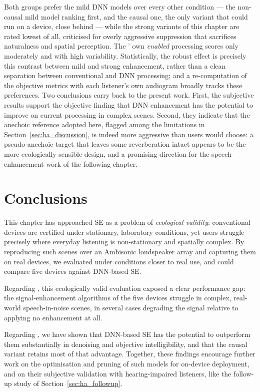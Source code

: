 Both groups prefer the mild \acrshort{DNN} models over every other condition ---
the non-causal mild model ranking first, and the causal one, the only variant
that could run on a device, close behind --- while the strong variants of this
chapter are rated lowest of all, criticised for overly aggressive suppression
that sacrifices naturalness and spatial perception. The ' own
\emph{enabled} processing scores only moderately and with high variability.
Statistically, the robust effect is precisely this contrast between mild and
strong enhancement, rather than a clean separation between conventional and
\acrshort{DNN} processing; and a re-computation of the objective metrics with
each listener's own audiogram broadly tracks these preferences. Two conclusions
carry back to the present work. First, the subjective results support the
objective finding that \acrshort{DNN} enhancement has the potential to improve on
current  processing in complex scenes. Second, they indicate that
the anechoic reference adopted here, flagged among the limitations in
Section~\ref{sec:ha_discussion}, is indeed more aggressive than 
users would choose: a pseudo-anechoic target that leaves some reverberation
intact appears to be the more ecologically sensible design, and a promising
direction for the speech-enhancement work of the following chapter.

\section{Conclusions}
\label{sec:ha_conclusions}

This chapter has approached  \acrshort{SE} as a problem of
\emph{ecological validity}: conventional devices are certified under stationary,
laboratory conditions, yet users struggle precisely where everyday listening is
non-stationary and spatially complex. By reproducing such scenes over an
Ambisonic loudspeaker array and capturing them on real devices, we evaluated under conditions closer to real use, and
could compare five  devices against \acrshort{DNN}-based \acrshort{SE}.

Regarding , this ecologically valid evaluation exposed a clear
performance gap: the signal-enhancement algorithms of the five devices struggle
in complex, real-world speech-in-noise scenes, in several cases degrading the
signal relative to applying no enhancement at all. 

Regarding , we have shown that \acrshort{DNN}-based \acrfull{SE} has the potential to outperform
them substantially in denoising and objective intelligibility, and that the
causal variant retains
most of that advantage. Together, these findings encourage further work on the
optimisation and pruning of such models for on-device deployment, and on their
subjective validation with hearing-impaired listeners, like the follow-up study
of Section~\ref{sec:ha_followup}.

